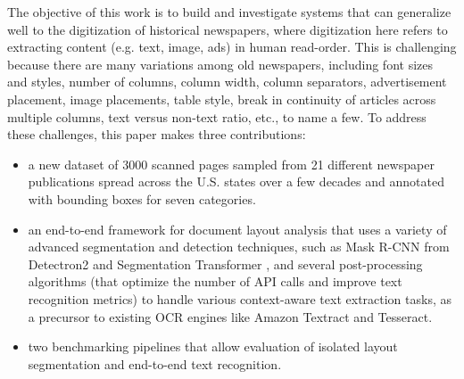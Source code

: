 \documentclass[letterpaper]{article} %
\begin{document}
The objective of this work is to build and investigate systems that can generalize well to the digitization of historical newspapers, where digitization here refers to extracting content (e.g. text, image, ads) in human read-order.
This is challenging because there are many variations among old newspapers, including font sizes and styles, number of columns, column width, column separators, advertisement placement, image placements, table style, break in continuity of articles across multiple columns, text versus non-text ratio, etc., to name a few. To address these challenges, this paper makes three contributions:
\begin{itemize}
    \item a new dataset of 3000 scanned pages sampled from 21 different newspaper publications spread across the U.S. states over a few decades and annotated with bounding boxes for seven categories.
    \item an end-to-end framework for document layout analysis that uses a variety of advanced segmentation and detection techniques, such as Mask R-CNN from Detectron2 \cite{wu2019detectron2} and Segmentation Transformer \cite{Zheng_2021_CVPR}, and several post-processing algorithms (that optimize the number of API calls and improve text recognition metrics) to handle various context-aware text extraction tasks, as a precursor to existing OCR engines like Amazon Textract and Tesseract.
    \item two benchmarking pipelines that allow evaluation of isolated layout segmentation and end-to-end text recognition.
\end{itemize}


\end{document}
